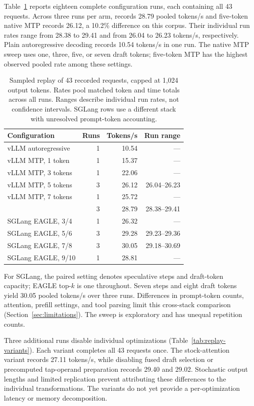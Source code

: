Table~\ref{tab:request-replay} reports eighteen complete configuration runs, each containing all 43 requests. Across three runs per arm, \sys{} records 28.79 pooled tokens/s and five-token native MTP records 26.12, a 10.2\% difference on this corpus. Their individual run rates range from 28.38 to 29.41 and from 26.04 to 26.23 tokens/s, respectively. Plain autoregressive decoding records 10.54 tokens/s in one run. The native MTP sweep uses one, three, five, or seven draft tokens; five-token MTP has the highest observed pooled rate among these settings.

\begin{table}[t]
\caption{Sampled replay of 43 recorded requests, capped at 1,024 output tokens. Rates pool matched token and time totals across all runs. Ranges describe individual run rates, not confidence intervals. SGLang rows use a different stack with unresolved prompt-token accounting.}
\label{tab:request-replay}
\centering\small
\begin{tabular}{@{}lrrr@{}}
\toprule
Configuration & Runs & Tokens/s & Run range \\
\midrule
vLLM autoregressive & 1 & 10.54 & --- \\
vLLM MTP, 1 token & 1 & 15.37 & --- \\
vLLM MTP, 3 tokens & 1 & 22.06 & --- \\
vLLM MTP, 5 tokens & 3 & 26.12 & 26.04--26.23 \\
vLLM MTP, 7 tokens & 1 & 25.72 & --- \\
\sys{} & 3 & 28.79 & 28.38--29.41 \\
\midrule
SGLang EAGLE, 3/4 & 1 & 26.32 & --- \\
SGLang EAGLE, 5/6 & 3 & 29.28 & 29.23--29.36 \\
SGLang EAGLE, 7/8 & 3 & 30.05 & 29.18--30.69 \\
SGLang EAGLE, 9/10 & 1 & 28.81 & --- \\
\bottomrule
\end{tabular}
\end{table}

For SGLang, the paired setting denotes speculative steps and draft-token capacity; EAGLE top-$k$ is one throughout. Seven steps and eight draft tokens yield 30.05 pooled tokens/s over three runs. Differences in prompt-token counts, attention, prefill settings, and tool parsing limit this cross-stack comparison (Section~\ref{sec:limitations}). The sweep is exploratory and has unequal repetition counts.

Three additional runs disable individual \sys{} optimizations (Table~\ref{tab:replay-variants}). Each variant completes all 43 requests once. The stock-attention variant records 27.11 tokens/s, while disabling fused draft selection or precomputed tap-operand preparation records 29.40 and 29.02. Stochastic output lengths and limited replication prevent attributing these differences to the individual transformations. The variants do not yet provide a per-optimization latency or memory decomposition.

